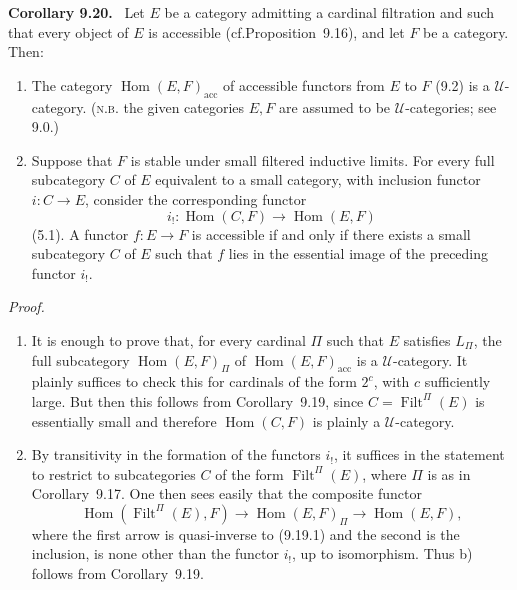 \documentclass[11pt]{article}
\newcommand{\U}{\mathcal{U}}
\newcommand{\Filt}{\operatorname{Filt}}
\newcommand{\Hhom}{\operatorname{Hom}}
\newcommand{\acc}{\mathrm{acc}}
\newcommand{\cf}{cf.}
\newcommand{\NB}{\textsc{n.b.}}
\newenvironment{statement}[1]{\par\medskip\noindent\textbf{#1.}\ }{\par\medskip}
\newenvironment{prooftext}{\par\noindent\emph{Proof.}\ }{\par\medskip}
\begin{document}
\begin{statement}{Corollary 9.20}
Let $E$ be a category admitting a cardinal filtration and such that every object of $E$ is accessible (\cf Proposition~9.16), and let $F$ be a category. Then:
\begin{enumerate}[label=\alph*)]
\item The category $\Hhom(E,F)_{\acc}$ of accessible functors from $E$ to $F$ (9.2) is a $\U$-category. (\NB{} the given categories $E,F$ are assumed to be $\U$-categories; see 9.0.)
\item Suppose that $F$ is stable under small filtered inductive limits. For every full subcategory $C$ of $E$ equivalent to a small category, with inclusion functor $i:C\to E$, consider the corresponding functor
\[
 i_!:\Hhom(C,F)\longrightarrow \Hhom(E,F)
\]
(5.1). A functor $f:E\to F$ is accessible if and only if there exists a small subcategory $C$ of $E$ such that $f$ lies in the essential image of the preceding functor $i_!$.
\end{enumerate}
\end{statement}

\begin{prooftext}
\begin{enumerate}[label=\alph*)]
\item It is enough to prove that, for every cardinal $\Pi$ such that $E$ satisfies $L_\Pi$, the full subcategory $\Hhom(E,F)_\Pi$ of $\Hhom(E,F)_{\acc}$ is a $\U$-category. It plainly suffices to check this for cardinals of the form $2^c$, with $c$ sufficiently large. But then this follows from Corollary~9.19, since $C=\Filt^\Pi(E)$ is essentially small and therefore $\Hhom(C,F)$ is plainly a $\U$-category.

\item By transitivity in the formation of the functors $i_!$, it suffices in the statement to restrict to subcategories $C$ of the form $\Filt^\Pi(E)$, where $\Pi$ is as in Corollary~9.17. One then sees easily that the composite functor
\[
\Hhom(\Filt^\Pi(E),F)\longrightarrow \Hhom(E,F)_\Pi\longrightarrow \Hhom(E,F),
\]
where the first arrow is quasi-inverse to (9.19.1) and the second is the inclusion, is none other than the functor $i_!$, up to isomorphism. Thus b) follows from Corollary~9.19.
\end{enumerate}
\end{prooftext}
\end{document}
